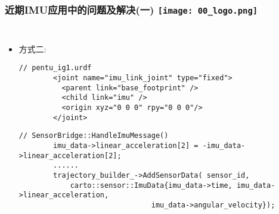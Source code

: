 
\begin{frame}[fragile]
  \frametitle{近期IMU应用中的问题及解决(一) \hfill \texttt{[image: 00\_logo.png]}}
  \begin{columns}
    
    \begin{itemize}
      \item 方式二:
      
      \begin{lstlisting}[frame=shadowbox]  
        // pentu_ig1.urdf
        <joint name="imu_link_joint" type="fixed">
          <parent link="base_footprint" />
          <child link="imu" />
          <origin xyz="0 0 0" rpy="0 0 0"/>
        </joint>
      \end{lstlisting}

      \begin{lstlisting}[frame=shadowbox]  
        // SensorBridge::HandleImuMessage()
        imu_data->linear_acceleration[2] = -imu_data->linear_acceleration[2];    
        ......    
        trajectory_builder_->AddSensorData( sensor_id,
            carto::sensor::ImuData{imu_data->time, imu_data->linear_acceleration,
                               imu_data->angular_velocity});
      \end{lstlisting}

    \end{itemize}
    

  
  \end{columns}
  \end{frame}   



